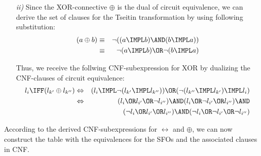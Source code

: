 {\begin{enumerate}
\begin{eqnarray*}
	&&[((\lnot l_{i^{\prime }} \OR\lnot l_{i^{\prime\prime }}) \AND (l_{i^{\prime }}
	\OR l_{i^{\prime\prime }})) \OR l_{i}] \\
	&\Leftrightarrow &(\lnot l_{i}\OR\lnot l_{i^{\prime }}\OR l_{i^{\prime
	\prime }})\AND(\lnot l_{i}\OR l_{i^{\prime }}\OR\lnot l_{i^{\prime \prime }})%
	\AND \\
	&&(l_{i} \OR\lnot l_{i^{\prime }} \OR\lnot l_{i^{\prime\prime }})\AND
	(l_{i}\OR l_{i^{\prime }}\OR l_{i^{\prime \prime }})
	\end{eqnarray*}

	\item[\textit{ii)}] Since the \textrm{XOR}-connective $\oplus $ is the dual
	of circuit equivalence, we can derive the set of clauses for the Tseitin
	transformation by using following substitution:%
	\begin{eqnarray*}
	(a\oplus b) &\equiv &\lnot ((a\IMPL b)\AND(b\IMPL a)) \\
	&\equiv &\lnot (a\IMPL b)\OR\lnot (b\IMPL a)
	\end{eqnarray*}

	Thus, we receive the follwing CNF-subexpression for \textrm{XOR} by
	dualizing the CNF-clauses of circuit equivalence:%
	\begin{eqnarray*}
	l_{i}\IFF(l_{k^{\prime }}\oplus l_{k^{\prime \prime }}) &\Leftrightarrow
	&(l_{i}\IMPL\lnot (l_{k^{\prime }}\IMPL l_{k^{\prime \prime }}))\OR(\lnot
	(l_{k^{\prime \prime }}\IMPL l_{k^{\prime }})\IMPL l_{i}) \\
	&\Leftrightarrow &(l_{i}\OR l_{i^{\prime }}\OR\lnot l_{i^{\prime \prime
	}})\AND(l_{i}\OR\lnot l_{i^{\prime }}\OR l_{i^{\prime \prime }})\AND \\
	&&(\lnot l_{i}\OR l_{i^{\prime }}\OR l_{i^{\prime \prime }})\AND(\lnot 
	l_{i}\OR\lnot l_{i^{\prime }}\OR\lnot l_{i^{\prime \prime }})
	\end{eqnarray*}
	\end{enumerate}

	According to the derived CNF-subexpressions for $\leftrightarrow$ and $\oplus$, we can now
	construct the table with the equivalences for the SFOs and the associated clauses in CNF.
		
}
